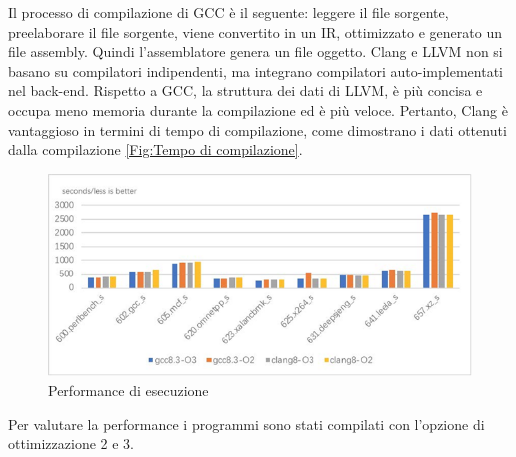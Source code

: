 \documentclass[12pt,a4paper]{report}
\begin{document}
Il processo di compilazione di GCC è il seguente: leggere il file sorgente, preelaborare il file sorgente, viene convertito in un IR, ottimizzato e generato un file assembly. Quindi l'assemblatore genera un file oggetto. 
Clang e LLVM non si basano su compilatori indipendenti, ma integrano compilatori auto-implementati nel back-end.  Rispetto a GCC, la struttura dei dati di LLVM, è più concisa e occupa meno memoria durante la compilazione ed è più veloce.  Pertanto, Clang  è vantaggioso in termini di tempo di compilazione, come dimostrano i dati ottenuti dalla compilazione \ref{Fig:Tempo di compilazione}.

\begin{figure}[h]
\centering
 \includegraphics[scale=0.4]{CompilatoriGrafici/exeComparison.png}
 \caption{Performance di esecuzione}
 \label{Fig:Performance di esecuzione}
\end{figure}
Per valutare la performance i programmi sono stati compilati con l'opzione di ottimizzazione 2 e 3.
\end{document}
